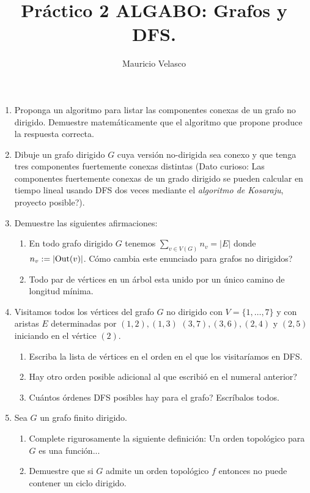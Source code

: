 \documentclass[12pt, a4paper]{article}
\date{}
\begin{document}
\title{Pr\'actico 2 ALGABO: Grafos y DFS.}
\author{Mauricio Velasco}
\maketitle{}
\begin{enumerate} 

\item Proponga un algoritmo para listar las componentes conexas de un grafo no dirigido. Demuestre matem\'aticamente que el algoritmo que propone produce la respuesta correcta.

\item Dibuje un grafo dirigido $G$ cuya versi\'on no-dirigida sea conexo y que tenga tres componentes fuertemente conexas distintas (Dato curioso: Las componentes fuertemente conexas de un grado dirigido se pueden calcular en tiempo lineal usando DFS dos veces mediante el {\it algoritmo de Kosaraju}, proyecto posible?). 


\item Demuestre las siguientes afirmaciones:
\begin{enumerate}
\item En todo grafo dirigido $G$ tenemos $\sum_{v\in V(G)} n_v=|E|$ donde $n_v:=|{\rm Out}(v)|$. C\'omo cambia este enunciado para grafos no dirigidos?
\item Todo par de v\'ertices en un \'arbol esta unido por un \'unico camino de longitud m\'inima.  
\end{enumerate}

\item Visitamos todos los v\'ertices del grafo $G$ no dirigido con $V=\{1,\dots, 7\}$ y con aristas $E$ determinadas por $(1,2), (1,3)$ $(3,7), (3,6), (2,4)$ y $(2,5)$ iniciando en el v\'ertice $(2)$.
\begin{enumerate}
\item Escriba la lista de v\'ertices en el orden en el que los visitar\'iamos en DFS.
\item Hay otro orden posible adicional al que escribi\'o en el numeral anterior?
\item Cu\'antos \'ordenes DFS posibles hay para el grafo? Escr\'ibalos todos.
\end{enumerate}


\item Sea $G$ un grafo finito dirigido.
\begin{enumerate}
\item Complete rigurosamente la siguiente definici\'on: Un orden topol\'ogico para $G$ es una funci\'on... 
\item Demuestre que si $G$ admite un orden topol\'ogico $f$ entonces no puede contener un ciclo dirigido.
\end{enumerate}



\end{enumerate}
\end{document}

